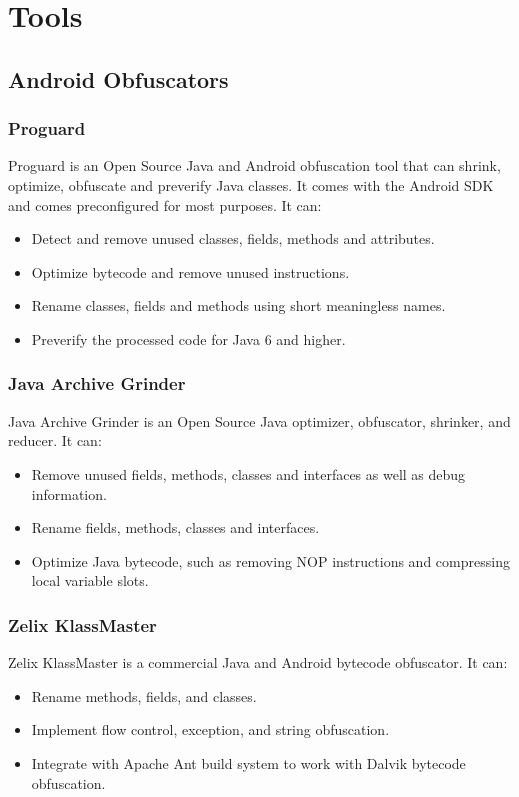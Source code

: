 \section{Tools}
\subsection{Android Obfuscators}
\subsubsection{Proguard}
Proguard \cite{proguard} is an Open Source Java and Android obfuscation tool that can shrink, optimize, obfuscate and preverify Java classes. It comes with the Android SDK and comes preconfigured for most purposes. It can:
\begin{itemize}[leftmargin=*,labelindent=1cm]
\item Detect and remove unused classes, fields, methods and attributes. \item Optimize bytecode and remove unused instructions.
\item Rename classes, fields and methods using short meaningless names.
\item Preverify the processed code for Java 6 and higher.
\end{itemize}
\subsubsection{Java Archive Grinder}
Java Archive Grinder \cite{ohuchi} is an Open Source Java optimizer, obfuscator, shrinker, and reducer. It can:
\begin{itemize}[leftmargin=*,labelindent=1cm]
\item Remove unused fields, methods, classes and interfaces as well as debug information.
\item Rename fields, methods, classes and interfaces.
\item Optimize Java bytecode, such as removing NOP instructions and compressing local variable slots.
\end{itemize}
\subsubsection{Zelix KlassMaster}
Zelix KlassMaster \cite{zelix} is a commercial Java and Android bytecode obfuscator. It can:
\begin{itemize}[leftmargin=*,labelindent=1cm]
\item Rename methods, fields, and classes.
\item Implement flow control, exception, and string obfuscation.
\item Integrate with Apache Ant build system to work with Dalvik bytecode obfuscation.
\end{itemize}
